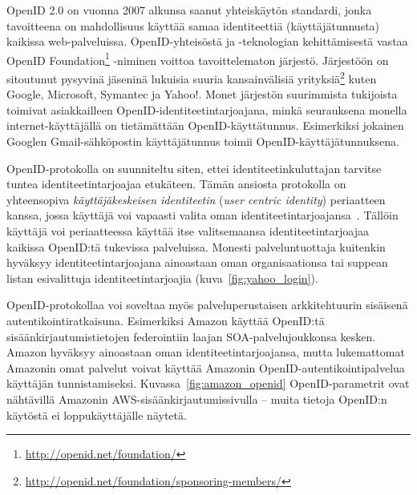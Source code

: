 \documentclass[finnish,gradu]{tktltiki}
\begin{document}


  OpenID 2.0 on vuonna 2007 alkunsa saanut yhteiskäytön standardi, jonka tavoitteena on mahdollisuus käyttää samaa identiteettiä (käyttäjätunnusta) kaikissa web-palveluissa. OpenID-yhteisöstä ja -teknologian kehittämisestä vastaa OpenID Foundation\footnote{\url{http://openid.net/foundation/}} -niminen voittoa tavoittelematon järjestö. Järjestöön on sitoutunut pysyvinä jäseninä lukuisia suuria kansainvälisiä yrityksiä\footnote{\url{http://openid.net/foundation/sponsoring-members/}} kuten Google, Microsoft, Symantec ja Yahoo!. Monet järjestön suurimmista tukijoista toimivat asiakkailleen OpenID-identiteetintarjoajana, minkä seurauksena monella internet-käyttäjällä on tietämättään OpenID-käyttätunnus. Esimerkiksi jokainen Googlen Gmail-sähköpostin käyttäjätunnus toimii  OpenID-käyttäjätunnuksena.

  OpenID-protokolla on suunniteltu siten, ettei identiteetinkuluttajan tarvitse tuntea identiteetintarjoajaa etukäteen. Tämän ansiosta protokolla on yhteensopiva \emph{käyttäjäkeskeisen identiteetin} (\emph{user centric identity}) periaatteen kanssa, jossa käyttäjä voi vapaasti valita oman identiteetintarjoajansa~\cite{openid_recordon_2009}. Tällöin käyttäjä voi periaatteessa käyttää itse valitsemaansa identiteetintarjoajaa kaikissa OpenID:tä tukevissa palveluissa.
  Monesti palveluntuottaja kuitenkin hyväksyy identiteetintarjoajana ainoastaan oman organisaationsa tai suppean listan esivalittuja identiteetintarjoajia (kuva~\ref{fig:yahoo_login}).

  OpenID-protokollaa voi soveltaa myös palveluperustaisen arkkitehtuurin sisäisenä autentikointiratkaisuna. Esimerkiksi Amazon käyttää OpenID:tä sisäänkirjautumistietojen federointiin laajan SOA-palvelujoukkonsa kesken. Amazon hyväksyy ainoastaan oman identiteetintarjoajansa, mutta lukemattomat Amazonin omat palvelut voivat käyttää Amazonin OpenID-autentikointipalvelua käyttäjän tunnistamiseksi.  Kuvassa~\ref{fig:amazon_openid} OpenID-parametrit ovat nähtävillä Amazonin AWS-sisäänkirjautumissivulla -- muita tietoja OpenID:n käytöstä ei loppukäyttäjälle näytetä.
\end{document}
